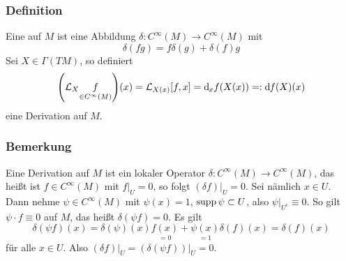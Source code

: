 \subsubsection[Definition: Derivation auf M]{Definition}
\label{ssub:151}
Eine  auf $M$ ist eine Abbildung $\delta:C^\infty (M) \to C^\infty (M)$ mit
\[
\delta(fg) = f\delta(g) + \delta(f)g
\]
Sei $X\in \Gamma(TM)$, so definiert
\[
\enbrace*{\mathcal{L}_X \underset{\in C^\infty (M)}{f}}(x) = \mathcal{L}_{X(x)} [f,x] = \mathd_x f(X(x)) =: \mathd f(X)(x)
\]
eine Derivation auf $M$.

\subsubsection{Bemerkung}
\label{ssub:152}
Eine Derivation auf $M$ ist ein lokaler Operator $\delta: C^\infty (M) \to C^\infty (M)$, das heißt ist $f\in C^\infty (M)$ mit $f\vert_U = 0$, so folgt $(\delta f)\vert_U = 0$. Sei nämlich $x\in U$. Dann nehme $\psi \in C^\infty (M)$ mit $\psi(x) = 1$, $\operatorname{supp} \psi \subset U$, also $\psi \vert_{U^c} \equiv 0$. So gilt $\psi \cdot f \equiv 0$ auf $M$, das heißt $\delta(\psi f) = 0$. Es gilt 
\[
\delta(\psi f)(x) = \delta(\psi)(x)\underset{= 0}{f(x)} + \underset{= 1}{\psi(x)}\delta(f)(x) = \delta(f)(x)
\]
für alle $x\in U$. Also $(\delta f)\vert_U = (\delta(\psi f))\vert_U = 0$.

